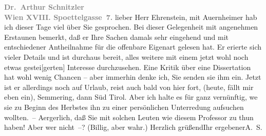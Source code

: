 \pstart
           \textcolor{gray}{\textbf{Dr. Arthur Schnitzler}}{\\}\textcolor{gray}{\textbf{Wien XVIII. Spoettelgasse 7.}}\pend
           \vspace{0.5em}
\pstart
           lieber Herr Ehrenstein, mit Auernheimer hab ich dieser Tage viel über Sie gesprochen. Bei dieser
               Gelegenheit mit angenehmen Erstaunen bemerkt, daß er Ihre Sachen damals sehr
               eingehend und mit entschiedener Antheilnahme für die offenbare Eigenart gelesen hat.
               Er eri{\geminationn}erte sich vieler Details und ist durchaus bereit,
               alles weitere mit einem jetzt wohl noch etwas gestei{\pb}{[}gerten{]} Interesse durchzusehen. Eine Kritik über eine Dissertation hat wohl wenig
               Chancen – aber immerhin denke ich, Sie senden sie ihm ein. Jetzt ist er allerdings
               noch auf Urlaub, reist auch bald von hier fort, (heute, fällt mir eben ein), Semmering, dann Süd
                  Tirol. Aber ich halte es für ganz vernünftig, we{\geminationn} sie zu Beginn des Herbstes ihn zu einer persönlichen Unterredung aufsuchen
               wollten. – Aergerlich, daß Sie mit solchen Leuten wie diesem Professor zu thun haben! Aber wer nicht –?
               (Billig, aber wahr.) Herzlich grüßend\hspace*{1.5em}Ihr
                  ergebener\spacefill\mbox{A. S.}\pend
           \endnumbering{}  \newcommand{\dateiname}{L01859}\newcommand{\titel}{Arthur Schnitzler an Albert Ehrenstein, 24. 7. 1909}\newcommand{\editorInnen}{Martin Anton Müller und Gerd-Hermann Susen}
